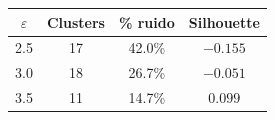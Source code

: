 \begin{tabular}{cccc}
\toprule
$\varepsilon$ & Clusters & \% ruido & Silhouette \\
\midrule
2.5 & 17 & 42.0\% & $-0.155$ \\
3.0 & 18 & 26.7\% & $-0.051$ \\
3.5 & 11 & 14.7\% & $0.099$ \\
\bottomrule
\end{tabular}